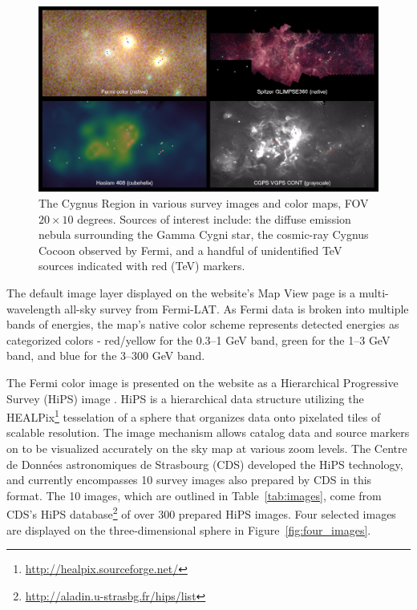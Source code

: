 \begin{figure}[tb]
  \centerline{\includegraphics[width=\textwidth]{figures/cygnus_region}}
  \caption{The Cygnus Region in various survey images and color maps, FOV $20 \times 10$ degrees. Sources of interest include: the diffuse emission nebula surrounding the Gamma Cygni star, the cosmic-ray Cygnus Cocoon observed by Fermi, and a handful of unidentified TeV sources indicated with red (TeV) markers.}
  \label{fig:cygnus}
\end{figure}
%

The default image layer displayed on the website's Map View page is a multi-wavelength all-sky survey from Fermi-LAT. As Fermi data is broken into multiple bands of energies, the map's native color scheme represents detected energies as categorized colors - red/yellow for the 0.3--1 GeV band, green for the 1--3 GeV band, and blue for the 3--300 GeV band.

 The Fermi color image is presented on the website as a Hierarchical Progressive Survey (HiPS) image \cite{hips}. HiPS is a hierarchical data structure utilizing the HEALPix\footnote[2]{\url{http://healpix.sourceforge.net/}} tesselation of a sphere that organizes data onto pixelated tiles of scalable resolution. The image mechanism allows catalog data and source markers on \gammasky to be visualized accurately on the sky map at various zoom levels. The Centre de Donn\'{e}es astronomiques de Strasbourg (CDS) developed the HiPS technology, and \gammasky currently encompasses 10 survey images also prepared by CDS in this format. The 10 images, which are outlined in Table~\ref{tab:images}, come from CDS's HiPS database\footnote[3]{\url{http://aladin.u-strasbg.fr/hips/list}} of over 300 prepared HiPS images. Four selected images are displayed on the three-dimensional sphere in Figure~\ref{fig:four_images}.


